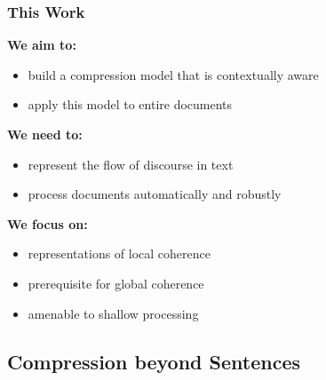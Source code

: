 \documentclass{beamer}
\begin{document}
\begin{frame}
  \frametitle{This Work}

\textbf{We aim to:}
\begin{itemize}
\item build a compression model that is contextually aware
\item apply this model to entire documents
\end{itemize}

\textbf{We need to:} 
\begin{itemize}
\item represent the \alert{flow of discourse} in text
\item process documents automatically and robustly 
\end{itemize} 

\textbf{We focus on:}
    \begin{itemize}
    \item  representations of \alert{local coherence}
    \item  prerequisite for global coherence
    \item amenable to shallow processing
   \end{itemize}
\end{frame}



\subsection{Compression beyond Sentences}

\end{document}
